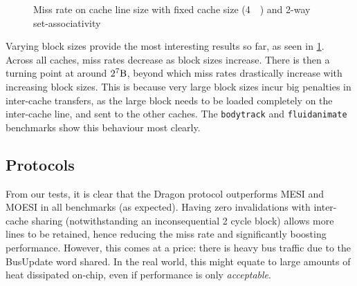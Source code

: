 \documentclass[date,tikzlibs,lmodern,10pt]{epreport}
\begin{document}
\begin{figure}[htbp]
\begin{tikzpicture}
	\end{tikzpicture}
	\caption{Miss rate on cache line size with fixed cache size (\SI{4}{\kibi\byte}) and 2-way set-associativity}\label{fig:miss_rate_line_size}
\end{figure}
Varying block sizes provide the most interesting results so far, as seen in \cref{fig:miss_rate_line_size}.
Across all caches, miss rates decrease as block sizes increase. There is then a turning point at around \(2^7 \si[]{\byte}\), beyond which miss rates drastically increase with increasing block sizes.
This is because very large block sizes incur big penalties in inter-cache transfers, as the large block needs to be loaded completely on the inter-cache line, and sent to the other caches.
The \texttt{bodytrack} and \texttt{fluidanimate} benchmarks show this behaviour most clearly.

\subsection{Protocols}
From our tests, it is clear that the Dragon protocol outperforms MESI and MOESI in all benchmarks (as expected).
Having zero invalidations with inter-cache sharing (notwithstanding an inconsequential 2 cycle block) allows more lines to be retained, hence reducing the miss rate and significantly boosting performance.
However, this comes at a price: there is heavy bus traffic due to the BusUpdate word shared. In the real world, this might equate to large amounts of heat dissipated on-chip, even if performance is only \emph{acceptable}.
\end{document}
